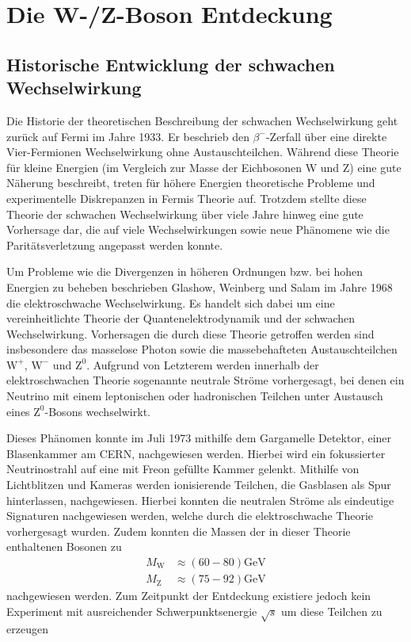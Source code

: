 
\section{Die W-/Z-Boson Entdeckung}


\subsection{Historische Entwicklung der schwachen Wechselwirkung}

Die Historie der theoretischen Beschreibung der schwachen Wechselwirkung geht zurück auf Fermi im Jahre 1933.
Er beschrieb den $\beta^-$-Zerfall über eine direkte Vier-Fermionen Wechselwirkung ohne Austauschteilchen.
Während diese Theorie für kleine Energien (im Vergleich zur Masse der Eichbosonen W und Z) eine gute Näherung beschreibt, treten für höhere Energien theoretische Probleme und experimentelle Diskrepanzen in Fermis Theorie auf.
Trotzdem stellte diese Theorie der schwachen Wechselwirkung über viele Jahre hinweg eine gute Vorhersage dar, die auf viele Wechselwirkungen sowie neue Phänomene wie die Paritätsverletzung angepasst werden konnte.

Um Probleme wie die Divergenzen in höheren Ordnungen bzw. bei hohen Energien zu beheben beschrieben Glashow, Weinberg und Salam im Jahre 1968 die elektroschwache Wechselwirkung.
Es handelt sich dabei um eine vereinheitlichte Theorie der Quantenelektrodynamik und der schwachen Wechselwirkung.
Vorhersagen die durch diese Theorie getroffen werden sind insbesondere das masselose Photon sowie die massebehafteten Austauschteilchen $\text{W}^+$, $\text{W}^-$ und $\text{Z}^0$.
Aufgrund von Letzterem werden innerhalb der elektroschwachen Theorie sogenannte neutrale Ströme vorhergesagt, bei denen ein Neutrino mit einem leptonischen oder hadronischen Teilchen unter Austausch eines $\text{Z}^0$-Bosons wechselwirkt.

Dieses Phänomen konnte im Juli 1973 mithilfe dem Gargamelle Detektor, einer Blasenkammer am CERN, nachgewiesen werden.
Hierbei wird ein fokussierter Neutrinostrahl auf eine mit Freon gefüllte Kammer gelenkt. 
Mithilfe von Lichtblitzen und Kameras werden ionisierende Teilchen, die Gasblasen als Spur hinterlassen, nachgewiesen.
Hierbei konnten die neutralen Ströme als eindeutige Signaturen nachgewiesen werden, welche durch die elektroschwache Theorie vorhergesagt wurden.
Zudem konnten die Massen der in dieser Theorie enthaltenen Bosonen zu 
\begin{align*}
	M_\text{W} &\approx \left(60-80\right)\si{\giga\electronvolt}\\
	M_\text{Z} &\approx \left(75-92\right)\si{\giga\electronvolt}
\end{align*}
nachgewiesen werden.
Zum Zeitpunkt der Entdeckung existiere jedoch kein Experiment mit ausreichender Schwerpunktsenergie $\sqrt{s}$ um diese Teilchen zu erzeugen

